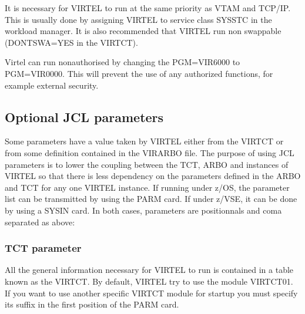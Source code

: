 \documentclass[letterpaper,10pt,english]{sphinxmanual}
\begin{document}
\sphinxAtStartPar
It is necessary for VIRTEL to run at the same priority as VTAM and TCP/IP. This is usually done by assigning VIRTEL to service class SYSSTC in the workload manager. It is also recommended that VIRTEL run non swappable (DONTSWA=YES in the VIRTCT).

\sphinxAtStartPar
Virtel can run non\sphinxhyphen{}authorised by changing the PGM=VIR6000 to PGM=VIR0000. This will prevent the use of any authorized functions, for example external security.

\ignorespaces 

\subsection{Optional JCL parameters}
\label{\detokenize{Installation_Guide:optional-jcl-parameters}}\label{\detokenize{Installation_Guide:index-10}}
\sphinxAtStartPar
Some parameters have a value taken by VIRTEL either from the VIRTCT or from some definition contained in the
VIRARBO file. The purpose of using JCL parameters is to lower the coupling between the TCT, ARBO and instances of
VIRTEL so that there is less dependency on the parameters defined in the ARBO and TCT for any one VIRTEL instance.
If running under z/OS, the parameter list can be transmitted by using the PARM card. If under z/VSE, it can be done by
using a SYSIN card. In both cases, parameters are positionnals and coma separated as above:\sphinxhyphen{}

\begin{sphinxVerbatim}[commandchars=\\\{\}]
\end{sphinxVerbatim}

\ignorespaces 

\subsubsection{TCT parameter}
\label{\detokenize{Installation_Guide:tct-parameter}}\label{\detokenize{Installation_Guide:index-11}}
\sphinxAtStartPar
All the general information necessary for VIRTEL to run is contained in a table known as the VIRTCT. By default, VIRTEL
try to use the module VIRTCT01. If you want to use another specific VIRTCT module for startup you must specify its
suffix in the first position of the PARM card.
\end{document}
